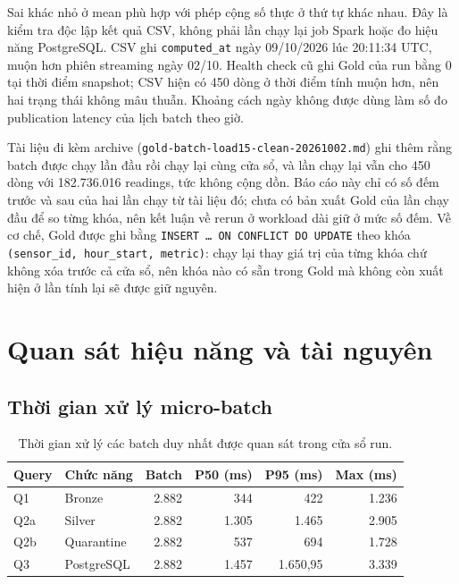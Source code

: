 Sai khác nhỏ ở mean phù hợp với phép cộng số thực ở thứ tự khác nhau. Đây là kiểm tra độc lập kết quả CSV, không phải lần chạy lại job Spark hoặc đo hiệu năng PostgreSQL. CSV ghi \texttt{computed\_at} ngày 09/10/2026 lúc 20:11:34 UTC, muộn hơn phiên streaming ngày 02/10. Health check cũ ghi Gold của run bằng 0 tại thời điểm snapshot; CSV hiện có 450 dòng ở thời điểm tính muộn hơn, nên hai trạng thái không mâu thuẫn. Khoảng cách ngày không được dùng làm số đo publication latency của lịch batch theo giờ.

Tài liệu đi kèm archive (\texttt{gold-batch-load15-clean-20261002.md}) ghi thêm rằng batch được chạy lần đầu rồi chạy lại cùng cửa sổ, và lần chạy lại vẫn cho 450 dòng với 182.736.016 readings, tức không cộng dồn. Báo cáo này chỉ có số đếm trước và sau của hai lần chạy từ tài liệu đó; chưa có bản xuất Gold của lần chạy đầu để so từng khóa, nên kết luận về rerun ở workload dài giữ ở mức số đếm. Về cơ chế, Gold được ghi bằng \texttt{INSERT \ldots{} ON CONFLICT DO UPDATE} theo khóa \texttt{(sensor\_id, hour\_start, metric)}: chạy lại thay giá trị của từng khóa chứ không xóa trước cả cửa sổ, nên khóa nào có sẵn trong Gold mà không còn xuất hiện ở lần tính lại sẽ được giữ nguyên.

\section{Quan sát hiệu năng và tài nguyên}

\subsection{Thời gian xử lý micro-batch}
\begin{table}[H]
\centering
\caption{Thời gian xử lý các batch duy nhất được quan sát trong cửa sổ run.}
\label{tab:microbatch-results}
\small
\begin{tabular}{l l r r r r}
\toprule
\textbf{Query} & \textbf{Chức năng} & \textbf{Batch} & \textbf{P50 (ms)} & \textbf{P95 (ms)} & \textbf{Max (ms)} \\
\midrule
Q1 & Bronze & 2.882 & 344 & 422 & 1.236 \\
Q2a & Silver & 2.882 & 1.305 & 1.465 & 2.905 \\
Q2b & Quarantine & 2.882 & 537 & 694 & 1.728 \\
Q3 & PostgreSQL & 2.882 & 1.457 & 1.650,95 & 3.339 \\
\bottomrule
\end{tabular}
\end{table}


